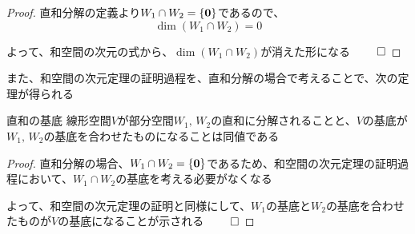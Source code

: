\documentclass[../../../topic_linear-algebra]{subfiles}
\begin{document}
\begin{proof}
  直和分解の定義より$W_1 \cap W_2 = \{ \vb*{0} \}$であるので、
  \begin{equation*}
    \dim(W_1 \cap W_2) = 0
  \end{equation*}

  よって、和空間の次元の式から、$\dim(W_1 \cap W_2)$が消えた形になる $\qed$
\end{proof}

\sectionline

また、和空間の次元定理の証明過程を、直和分解の場合で考えることで、次の定理が得られる

\begin{theorem}{直和の基底}
  線形空間$V$が部分空間$W_1,\,W_2$の直和に分解されることと、$V$の基底が$W_1,\,W_2$の基底を合わせたものになることは同値である
\end{theorem}

\begin{proof}
  直和分解の場合、$W_1 \cap W_2 = \{ \vb*{0} \}$であるため、和空間の次元定理の証明過程において、$W_1 \cap W_2$の基底を考える必要がなくなる

  \br

  よって、和空間の次元定理の証明と同様にして、$W_1$の基底と$W_2$の基底を合わせたものが$V$の基底になることが示される $\qed$
\end{proof}
\end{document}
